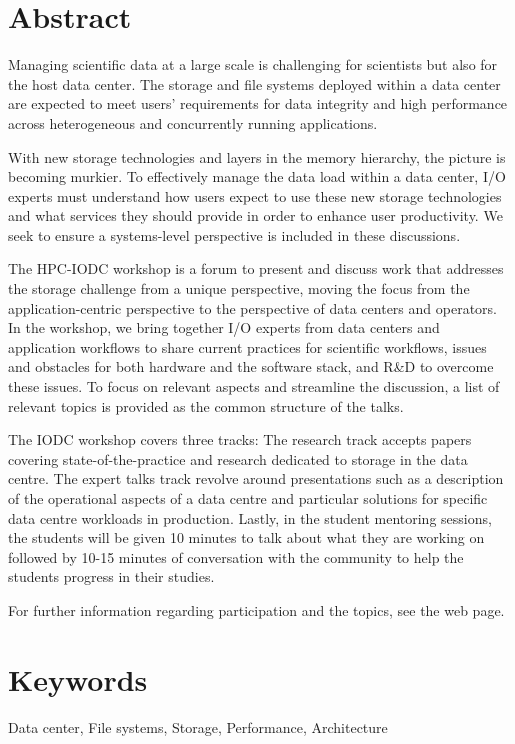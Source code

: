 \documentclass[a4paper,10pt]{article}
\begin{document}
\section{Abstract}
Managing scientific data at a large scale is challenging for scientists but also for the host data center.
The storage and file systems deployed within a data center are expected to meet users' requirements for data integrity and high performance across heterogeneous and concurrently running applications.

With new storage technologies and layers in the memory hierarchy, the picture is becoming murkier.
To effectively manage the data load within a data center, I/O experts must understand how users expect to use these new storage technologies and what services they should provide in order to enhance user productivity. We seek to ensure a systems-level perspective is included in these discussions.

The HPC-IODC workshop is a forum to present and discuss work that addresses the storage challenge from a unique perspective, moving the focus from the application-centric perspective to the perspective of data centers and operators.
In the workshop, we bring together I/O experts from data centers and application workflows to share current practices for scientific workflows, issues and obstacles for both hardware and the software stack, and R\&D to overcome these issues.
To focus on relevant aspects and streamline the discussion, a list of relevant topics is provided as the common structure of the talks.

The IODC workshop covers three tracks:
The research track accepts papers covering state-of-the-practice and research dedicated to storage in the data centre.
The expert talks track revolve around presentations such as a description of the operational aspects of a data centre and 
particular solutions for specific data centre workloads in production.
Lastly, in the student mentoring sessions, the students will be given 10 minutes to talk about what they are working on followed by 10-15 minutes of conversation with the community to help the students progress in their studies.

For further information regarding participation and the topics, see the web page.

\section{Keywords}
Data center, File systems, Storage, Performance, Architecture
\end{document}
